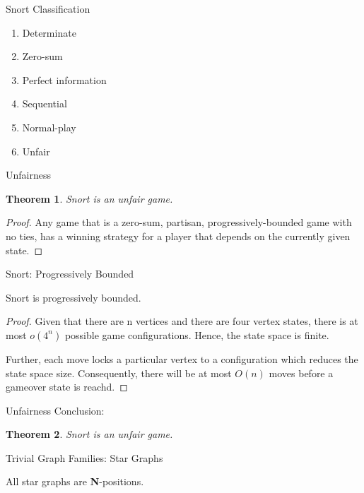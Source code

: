 \documentclass[mathserif]{beamer}
\newtheorem{thm}{Theorem}
\begin{document}
\begin{frame}{Snort Classification}
	\begin{enumerate}
		\item Determinate
		\item Zero-sum
		\item Perfect information
		\item Sequential
		\item Normal-play
		\item Unfair
	\end{enumerate}
\end{frame}

\begin{frame}{Unfairness}
	\begin{thm}
		Snort is an unfair game.
	\end{thm}
	\pause
	\vfill
	\begin{proof}
		Any game that is a zero-sum, partisan, progressively-bounded game with
		no ties, has a winning strategy for a player that depends on the
		currently given state.
	\end{proof}
	\pause
\end{frame}

\begin{frame}{Snort: Progressively Bounded}
	\begin{lemma}
		Snort is progressively bounded.
	\end{lemma}
	\begin{proof}
		Given that there are n vertices and there are four
		vertex states, there is at most $o(4^n)$ possible
		game configurations. Hence, the state space is
		finite. \newline

		Further, each move locks a particular vertex to a
		configuration which reduces the state space size.
		Consequently, there will be at most $O(n)$ moves
		before a gameover state is reachd.
	\end{proof}
\end{frame}

\begin{frame}{Unfairness}
	Conclusion:
	\begin{thm}
		Snort is an unfair game.
	\end{thm}
\end{frame}

\begin{frame}{Trivial Graph Families: Star Graphs}
	\begin{center}
		All star graphs are \textbf{N}-positions.
	\end{center}
	\vfill
	\begin{figure}[h]
		\centering
		\begin{tikzpicture}
			
		\end{tikzpicture}
	\end{figure}
\end{frame}
\end{document}
